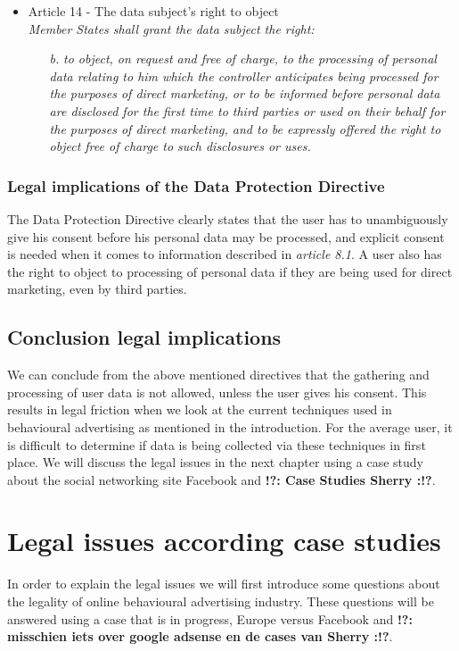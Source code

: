 \documentclass[11pt]{article}
\newcommand{\tocheck}[1]{{\bf !?: #1 :!?}}
\newcommand{\oba}{online behavioural advertising }
\newcommand{\DPD}{Data Protection Directive }
\begin{document}
\begin{itemize}
\begin{itemize}
		\end{itemize}

	\item Article 14 - The data subject's right to object\\
		\emph{Member States shall grant the data subject the right:}
		\begin{itemize}
			\item  [\textit{b.}] {\it to object, on request and free of charge, to the processing of personal data relating to him which the controller anticipates being processed for the purposes of direct marketing, or to be informed before personal data are disclosed for the first time to third parties or used on their behalf for the purposes of direct marketing, and to be expressly offered the right to object free of charge to such disclosures or uses.}
		\end{itemize}
		

\end{itemize}

\subsubsection{Legal implications of the \DPD}
The \DPD clearly states that the user has to unambiguously give his consent before his personal data may be processed, and explicit consent is needed when it comes to information described in \textit{article 8.1}. A user also has the right to object to processing of personal data if they are being used for direct marketing, even by third parties.

\subsection{Conclusion legal implications}

We can conclude from the above mentioned directives that the gathering and processing of user data is not allowed, unless the user gives his consent. This results in legal friction when we look at the current techniques used in behavioural advertising as mentioned in the introduction. For the average user, it is difficult to determine if data is being collected via these techniques in first place. We will discuss the legal issues in the next chapter using a case study about the social networking site Facebook and \tocheck{Case Studies Sherry}.


\section{Legal issues according case studies}
In order to explain the legal issues we will first introduce some questions about the legality of \oba industry. These questions will be answered using a case that is in progress, Europe versus Facebook and \tocheck{misschien iets over google adsense en de cases van Sherry}.
\end{document}
